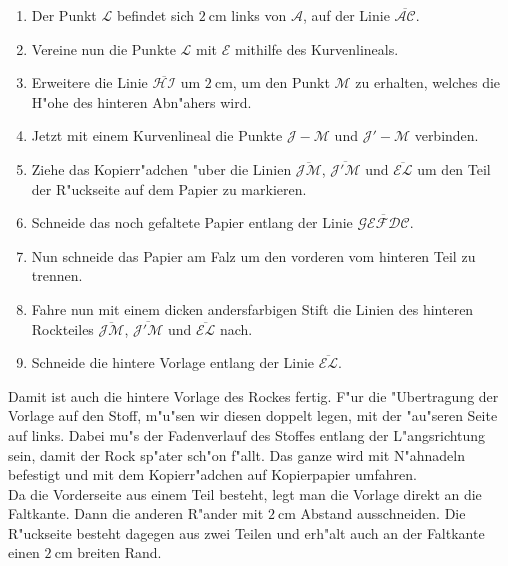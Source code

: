 \documentclass{scrartcl}
\begin{document}
\begin{enumerate}

  \item Der Punkt $\mathcal{L}$ befindet sich $\SI{2}{\centi\meter}$
    links von $\mathcal{A}$, auf der Linie $\overline{\mathcal{AC}}$.

  \item Vereine nun die Punkte $\mathcal{L}$ mit $\mathcal{E}$ mithilfe des
    Kurvenlineals.  

  \item Erweitere die Linie $\overline{\mathcal{HI}}$ um $\SI{2}{\centi\meter}$,
    um den Punkt $\mathcal{M}$ zu erhalten, welches die H"ohe des hinteren 
    Abn"ahers wird.

  \item Jetzt mit einem Kurvenlineal die Punkte $\mathcal{J-M}$ und
    $\mathcal{J'-M}$ verbinden.

  \item Ziehe das Kopierr"adchen "uber die Linien $\overline{\mathcal{JM}}$,
    $\overline{\mathcal{J'M}}$ und $\overline{\mathcal{EL}}$ um den Teil der
    R"uckseite auf dem Papier zu markieren.

  \item Schneide das noch gefaltete Papier entlang der Linie
    $\overline{\mathcal{GEFDC}}$. 

  \item Nun schneide das Papier am Falz um den vorderen vom hinteren Teil zu
    trennen. 

  \item Fahre nun mit einem dicken andersfarbigen Stift die Linien des hinteren
    Rockteiles $\overline{\mathcal{JM}}$, $\overline{\mathcal{J'M}}$ und
    $\overline{\mathcal{EL}}$ nach.

  \item Schneide die hintere Vorlage entlang der Linie $\overline{\mathcal{EL}}$.

\end{enumerate}

\noindent Damit ist auch die hintere Vorlage des Rockes fertig. F"ur die 
"Ubertragung der Vorlage auf den Stoff, m"u"sen wir diesen doppelt legen, mit
der "au"seren Seite auf links. Dabei mu"s der Fadenverlauf des Stoffes entlang 
der L"angsrichtung sein, damit der Rock sp"ater sch"on f"allt.
Das ganze wird mit N"ahnadeln befestigt und mit dem Kopierr"adchen auf
Kopierpapier umfahren. \\
Da die Vorderseite aus einem Teil besteht, legt man die Vorlage direkt an die 
Faltkante. Dann die anderen R"ander mit $\SI{2}{\centi\meter}$ Abstand
ausschneiden. Die R"uckseite besteht dagegen aus zwei Teilen und erh"alt auch
an der Faltkante einen $\SI{2}{\centi\meter}$ breiten Rand. \\ 
\mbox{} \\
\end{document}
